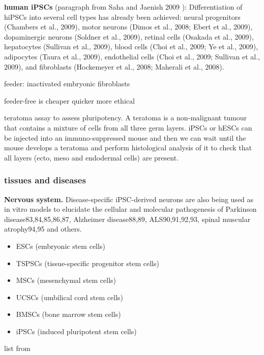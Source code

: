 \textbf{human iPSCs} (paragraph from Saha and Jaenish 2009 \cite{saha2009technical}):
Differentiation of hiPSCs into several cell types has already been achieved: neural progenitors (Chambers et al., 2009), motor neurons (Dimos et al., 2008; Ebert et al., 2009), dopaminergic neurons (Soldner et al., 2009), retinal cells (Osakada et al., 2009), hepatocytes (Sullivan et al., 2009), blood cells (Choi et al., 2009; Ye et al., 2009), adipocytes (Taura et al., 2009), endothelial cells (Choi et al., 2009; Sullivan et al., 2009), and fibroblasts (Hockemeyer et al., 2008; Maherali et al., 2008). 





feeder: inactivated embryonic fibroblasts

feeder-free is cheaper quicker more ethical

teratoma assay to assess pluripotency.
A teratoma is a non-malignant tumour that contains a mixture of cells from all three germ layers.
iPSCs or hESCs can be injected into an immuno-suppressed mouse and then we can wait until the mouse develops a teratoma and perform histological analysis of it to check that all layers (ecto, meso and endodermal cells) are present.




\subsubsection{tissues and diseases}

\textbf{Nervous system.}
Disease-specific iPSC-derived neurons are also being used as in vitro models to elucidate the cellular and molecular pathogenesis of Parkinson disease83,84,85,86,87, Alzheimer disease88,89, ALS90,91,92,93, spinal muscular atrophy94,95 and others.


\begin{itemize}
    \item ESCs (embryonic stem cells)
    \item TSPSCs (tissue-specific progenitor stem cells)
    \item MSCs (mesenchymal stem cells)
    \item UCSCs (umbilical cord stem cells)
    \item BMSCs (bone marrow stem cells)
    \item iPSCs (induced pluripotent stem cells)
\end{itemize}

list from \cite{mahla2016stem}


